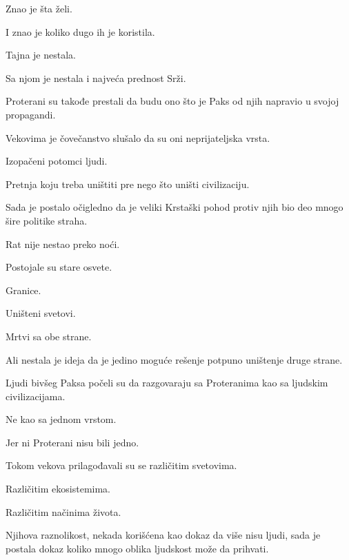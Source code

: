 Znao je šta želi.

I znao je koliko dugo ih je koristila.

\bigskip

Tajna je nestala.

\bigskip

Sa njom je nestala i najveća prednost Srži.

\bigskip

Proterani su takođe prestali da budu ono što je Paks od njih napravio u svojoj propagandi.

\bigskip

Vekovima je čovečanstvo slušalo da su oni neprijateljska vrsta.

Izopačeni potomci ljudi.

Pretnja koju treba uništiti pre nego što uništi civilizaciju.

\bigskip

Sada je postalo očigledno da je veliki Krstaški pohod protiv njih bio deo mnogo šire politike straha.

\bigskip

Rat nije nestao preko noći.

\bigskip

Postojale su stare osvete.

Granice.

Uništeni svetovi.

Mrtvi sa obe strane.

\bigskip

Ali nestala je ideja da je jedino moguće rešenje potpuno uništenje druge strane.

\bigskip

Ljudi bivšeg Paksa počeli su da razgovaraju sa Proteranima kao sa ljudskim civilizacijama.

\bigskip

Ne kao sa jednom vrstom.

\bigskip

Jer ni Proterani nisu bili jedno.

\bigskip

Tokom vekova prilagođavali su se različitim svetovima.

Različitim ekosistemima.

Različitim načinima života.

\bigskip

Njihova raznolikost, nekada korišćena kao dokaz da više nisu ljudi, sada je postala dokaz koliko mnogo oblika ljudskost može da prihvati.

\bigskip

